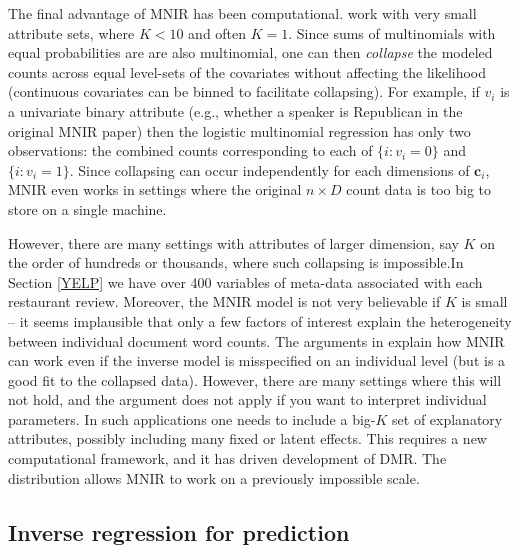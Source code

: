 \documentclass[12pt]{article}
\newcommand{\bm}[1]{\mathbf{#1}}
\begin{document}
The final advantage of MNIR has been computational.
\cite{taddy_multinomial_2013,taddy_measuring_2013} work with very small
attribute sets, where $K<10$ and often $K=1$.  Since sums of multinomials with
equal probabilities are are also multinomial, one can then {\it collapse} the
modeled counts across equal level-sets of the covariates without affecting the
likelihood (continuous covariates can be binned to facilitate collapsing).
For example, if $v_i$ is a univariate binary attribute (e.g., whether a
speaker is Republican in the original MNIR paper) then the logistic multinomial regression
  has only two observations: the combined counts
corresponding to each of $\{i:v_i=0\}$ and $\{i:v_i=1\}$. Since collapsing can
occur independently for each dimensions of $\bm{c}_i$,  MNIR  even
works in settings where the original $n\times D$ count data is too big to
store on a single machine.

However, there are many settings with attributes of  larger dimension, say $K$
on the order of hundreds or thousands, where such collapsing is impossible.In
Section \ref{YELP} we have over 400 variables of meta-data associated with
each restaurant review.  Moreover,  the MNIR model is not very believable if
$K$ is small -- it seems implausible that only a few factors of interest
explain the heterogeneity between individual document word counts. The
arguments in \cite{taddy_multinomial_2013,taddy_rejoinder:_2013} explain how
MNIR can work even if the inverse model is misspecified on an individual level
(but is a good fit to the collapsed data).  However, there are many settings
where this will not hold, and the argument does not apply if you want to
interpret individual parameters. In such applications one needs to
include a big-$K$ set of explanatory attributes, possibly including many fixed
or latent effects.   This requires a new computational framework, and it has
driven development of DMR.  The distribution allows MNIR to work on a
previously impossible scale.

\subsection{Inverse regression for prediction}
\end{document}
